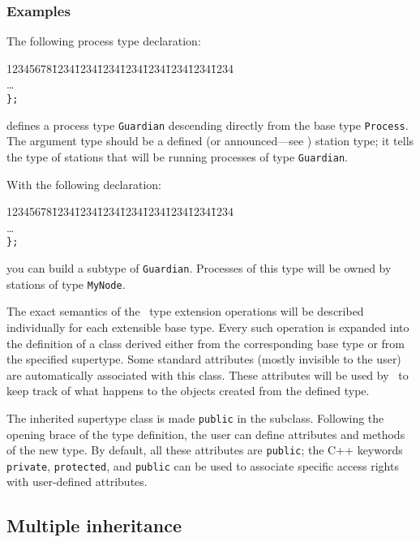 \subsubsection*{Examples}

\noindent
The following process type declaration:
{\tt\begin{tabbing}
12345678\=1234\=1234\=1234\=1234\=1234\=1234\=1234\=1234\kill
{}\\
\> \>\ldots \\
\> {\tt \};}
\end{tabbing}}
\noindent
defines a process type {\tt Guardian} descending directly from the base type
{\tt Process}.
The argument type should be a defined (or announced---see )
station type;
it tells the type of stations that will be running processes of type
{\tt Guardian}.

With the following declaration:
{\tt\begin{tabbing}
12345678\=1234\=1234\=1234\=1234\=1234\=1234\=1234\=1234\kill
{}\\
\> \>\ldots \\
\> {\tt \};}
\end{tabbing}}
\noindent
you can build a subtype of {\tt Guardian}.
Processes of this type will be owned by stations of type {\tt MyNode}.

\medskip

\noindent
The exact semantics of the \smurph\ type extension operations
will be described individually for each extensible base type.
Every such operation is expanded into the definition of a class
derived either from the corresponding base type or from
the specified supertype.
Some standard attributes (mostly invisible to the user) are automatically
associated with this class.
These attributes will be used by \smurph\ to keep track of what happens
to the objects created from the defined type.

The inherited supertype class is made {\tt public} in the subclass.
Following the opening brace of the type definition, the user can define
attributes and methods of the new type.
By default, all these attributes are {\tt public}; the C++ keywords
{\tt private}, {\tt protected}, and {\tt public} can be used to associate
specific access rights with user-defined attributes.

\subsection {Multiple inheritance}
\label{rm_st_mi}

